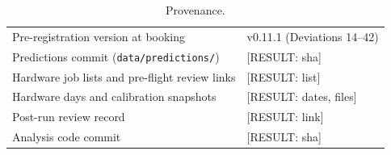 \documentclass[aps,prxquantum,reprint,superscriptaddress,nofootinbib,longbibliography,amsmath,amssymb]{revtex4-2}
\newcommand{\placeholder}[1]{\textcolor{red!70!black}{[RESULT: #1]}}
\begin{document}
\begin{table}[t]
\caption{Provenance. \label{tab:provenance}}
\begin{ruledtabular}
\begin{tabular}{ll}
Pre-registration version at booking & v0.11.1 (Deviations 14--42) \\
Predictions commit (\texttt{data/predictions/}) & \placeholder{sha} \\
Hardware job lists and pre-flight review links & \placeholder{list} \\
Hardware days and calibration snapshots & \placeholder{dates, files} \\
Post-run review record & \placeholder{link} \\
Analysis code commit & \placeholder{sha} \\
\end{tabular}
\end{ruledtabular}
\end{table}
\end{document}
